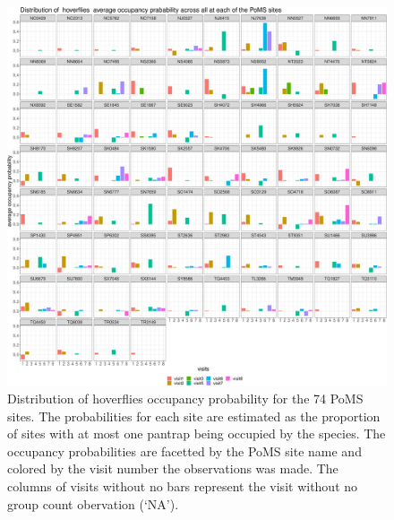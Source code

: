 \documentclass[
]{article}
\begin{document}
\begin{figure}

{\centering \includegraphics{SupplementaryInformationOne_files/figure-pdf/fig-hvSOPlot-1.pdf}

}

\caption{\label{fig-hvSOPlot}Distribution of hoverflies occupancy
probability for the 74 PoMS sites. The probabilities for each site are
estimated as the proportion of sites with at most one pantrap being
occupied by the species. The occupancy probabilities are facetted by the
PoMS site name and colored by the visit number the observations was
made. The columns of visits without no bars represent the visit without
no group count obervation (`NA').}

\end{figure}
\end{document}
